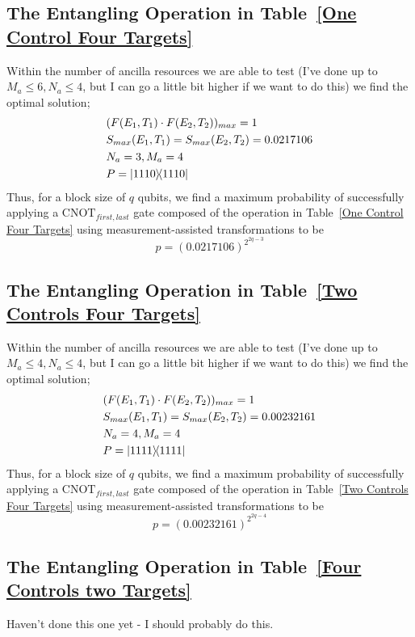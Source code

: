 \documentclass[aps,pra,twocolumn,showpacs,superscriptaddress,floatfix,10pt]{revtex4}
\begin{document}
\subsection{The Entangling Operation in Table~\ref{One Control Four Targets}}
Within the number of ancilla resources we are able to test (I've done up to $M_a \le 6,N_a \le 4$, but I can go a little bit higher if we want to do this) we find the optimal solution;
\begin{eqnarray}
& (F(E_1,T_1) \cdot F(E_2,T_2))_{max} = 1 \nonumber \\
& S_{max}(E_1,T_1) = S_{max}(E_2,T_2) = 0.0217106 \\
& N_a = 3,M_a=4 \nonumber \\
& P = \outerproduct{1110}{1110} \nonumber	
\end{eqnarray}
Thus, for a block size of $q$ qubits, we find a maximum probability of successfully applying a $\mbox{CNOT}_{first,last}$ gate composed of the operation in Table~\ref{One Control Four Targets} using measurement-assisted transformations to be
\begin{equation}
\label{1C4T Result}
p = (0.0217106)^{2^{2q-3}}
\end{equation}
\subsection{The Entangling Operation in Table~\ref{Two Controls Four Targets}}
 Within the number of ancilla resources we are able to test (I've done up to $M_a \le 4,N_a \le 4$, but I can go a little bit higher if we want to do this) we find the optimal solution;
 \begin{eqnarray}
 & (F(E_1,T_1) \cdot F(E_2,T_2))_{max} = 1 \nonumber\\
 & S_{max}(E_1,T_1) = S_{max}(E_2,T_2) = 0.00232161 \\
 & N_a = 4,M_a=4 \nonumber\\
 & P = \outerproduct{1111}{1111} \nonumber	
 \end{eqnarray}
 Thus, for a block size of $q$ qubits, we find a maximum probability of successfully applying a $\mbox{CNOT}_{first,last}$ gate composed of the operation in Table~\ref{Two Controls Four Targets} using measurement-assisted transformations to be
 \begin{equation}
 \label{2C4T Result}
 p = (0.00232161)^{2^{2q-4}}
 \end{equation}
 \subsection{The Entangling Operation in Table~\ref{Four Controls two Targets}}
 Haven't done this one yet - I should probably do this.
\end{document}
